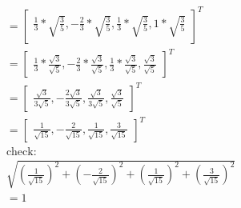\documentclass[12pt]{article}
\begin{document}
\begin{flushleft}
\begin{align}
        = \begin{bmatrix}
              \frac{1}{3} * \sqrt{\frac{3}{5}}, -\frac{2}{3}* \sqrt{\frac{3}{5}}, \frac{1}{3}* \sqrt{\frac{3}{5}}, 1 * \sqrt{\frac{3}{5}}
          \end{bmatrix}^{T}                                     \\
        = \begin{bmatrix}
              \frac{1}{3} * \frac{\sqrt{3}}{\sqrt{5}}, -\frac{2}{3}*\frac{\sqrt{3}}{\sqrt{5}}, \frac{1}{3}*\frac{\sqrt{3}}{\sqrt{5}},
              \frac{\sqrt{3}}{\sqrt{5}}
          \end{bmatrix}^{T} \\
        =\begin{bmatrix}
             \frac{\sqrt{3}}{3\sqrt{5}}, - \frac{2\sqrt{3}}{3\sqrt{5}}, \frac{\sqrt{3}}{3\sqrt{5}},
             \frac{\sqrt{3}}{\sqrt{5}}
         \end{bmatrix}^{T}                                   \\
        = \begin{bmatrix}
              \frac{1}{\sqrt{15}}, - \frac{2}{\sqrt{15}}, \frac{1}{\sqrt{15}}, \frac{3}{\sqrt{15}}
          \end{bmatrix}^{T}                                                                    \\
        \text{check:}                                                                                                                                                                                                \\
        \sqrt{(\frac{1}{\sqrt{15}})^{2} + (- \frac{2}{\sqrt{15}})^{2} + (\frac{1}{\sqrt{15}})^{2} + (\frac{3}{\sqrt{15}})^{2}}                                                                                       \\
        = 1
    \end{align}


\end{flushleft}
\end{document}
